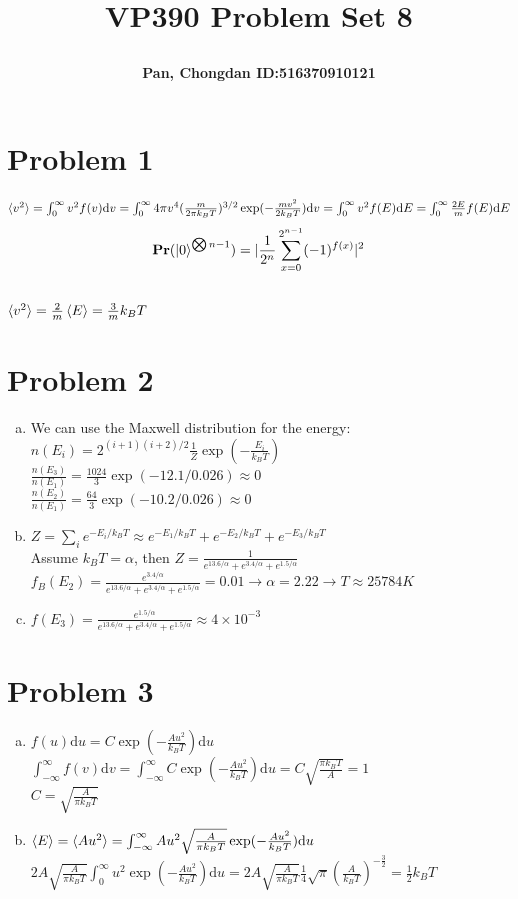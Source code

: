 \documentclass[a4paper]{article}
\title{\Large \textbf{VP390 Problem Set 8}\\
\author{\textbf{Pan, Chongdan ID:516370910121}\\
}
}
\begin{document}
\maketitle
\section{Problem 1}
\noindent
$\braket{v^2}=\int_0^{\infty}v^2f(v)\mathrm{d}v=\int_0^{\infty}4\pi v^4(\frac{m}{2\pi k_BT})^{3/2}\exp(-\frac{mv^2}{2k_BT})\mathrm{d}v=\int_0^{\infty}v^2f(E)\mathrm{d}E=\int_0^{\infty}\frac{2E}{m}f(E)\mathrm{d}E$
$$\textbf{Pr}(\ket{0}^{\bigotimes n-1})=|\frac{1}{2^n}\sum_{x=0}^{2^{n-1}}(-1)^{f(x)}|^2$$
\\$\braket{v^2}=\frac{2}{m}\braket{E}=\frac{3}{m}k_BT$
\section{Problem 2}
\noindent
\begin{enumerate}[(a)]
    \item We can use the Maxwell distribution for the energy: 
    \\$n(E_i)=2^{(i+1)(i+2)/2}\frac{1}{Z}\exp(-\frac{E_i}{k_BT})$
    \\$\frac{n(E_3)}{n(E_1)}=\frac{1024}{3}\exp(-12.1/0.026)\approx0$
    \\$\frac{n(E_2)}{n(E_1)}=\frac{64}{3}\exp(-10.2/0.026)\approx0$
    \item $Z=\sum_i e^{-E_i/k_BT}\approx e^{-E_1/k_BT}+e^{-E_2/k_BT}+e^{-E_3/k_BT}$
    \\Assume $k_BT=\alpha$, then $Z=\frac{1}{e^{13.6/\alpha}+e^{3.4/\alpha}+e^{1.5/\alpha}}$
    \\$f_B(E_2)=\frac{e^{3.4/\alpha}}{e^{13.6/\alpha}+e^{3.4/\alpha}+e^{1.5/\alpha}}=0.01\rightarrow\alpha=2.22\rightarrow T\approx 25784K$
    \item $f(E_3)=\frac{e^{1.5/\alpha}}{e^{13.6/\alpha}+e^{3.4/\alpha}+e^{1.5/\alpha}}\approx4\times10^{-3}$
\end{enumerate}
\section{Problem 3}
\noindent
\begin{enumerate}[(a)]
    \item $f(u)\mathrm{d}u=C\exp(-\frac{Au^2}{k_BT})\mathrm{d}u$
    \\$\int_{-\infty}^\infty f(v)\mathrm{d}v=\int_{-\infty}^\infty C\exp(-\frac{Au^2}{k_BT})\mathrm{d}u=C\sqrt{\frac{\pi k_BT}{A}}=1$
    \\$C=\sqrt{\frac{A}{\pi k_BT}}$
    \item $\braket{E}=\braket{Au^2}=\int_{-\infty}^\infty Au^2\sqrt{\frac{A}{\pi k_BT}}\exp(-\frac{Au^2}{k_BT})\mathrm{d}u$
    \\$2A\sqrt{\frac{A}{\pi k_BT}}\int_0^\infty u^2\exp(-\frac{Au^2}{k_BT})\mathrm{d}u=2A\sqrt{\frac{A}{\pi k_BT}}\frac{1}{4}\sqrt{\pi}(\frac{A}{k_BT})^{-\frac{3}{2}}=\frac{1}{2}k_BT$
\end{enumerate}
\end{document}
